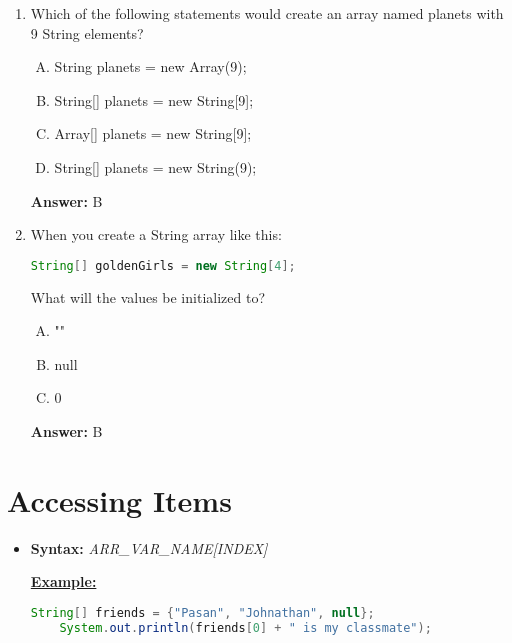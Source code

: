\documentclass[12pt]{article}
\begin{document}
\bigskip

\begin{enumerate}[1.]
    \item

    Which of the following statements would create an array named planets with 9
    String elements?

    \begin{enumerate}[A.]
        \item String planets = new Array(9);
        \item String[] planets = new String[9];
        \item Array[] planets = new String[9];
        \item String[] planets = new String(9);
    \end{enumerate}

    \bigskip

    \textbf{Answer:} B

    \item

    When you create a String array like this:

    \begin{lstlisting}[language=Java]
    String[] goldenGirls = new String[4];
    \end{lstlisting}

    What will the values be initialized to?

    \bigskip

    \begin{enumerate}[A.]
        \item ""
        \item null
        \item 0
    \end{enumerate}

    \bigskip

    \textbf{Answer:} B

\end{enumerate}

\bigskip

\section{Accessing Items}

\bigskip

\begin{itemize}
    \item \textbf{Syntax:} \textit{ARR\_VAR\_NAME[INDEX]}

    \bigskip

    \underline{\textbf{Example:}}

    \bigskip

    \begin{lstlisting}[language=Java]
    String[] friends = {"Pasan", "Johnathan", null};
    System.out.println(friends[0] + " is my classmate");
    \end{lstlisting}
\end{itemize}
\end{document}
